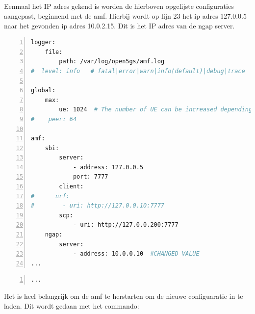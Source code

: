 \subsection{}%
\label{sec:open5gs_amf}%

Eenmaal het IP adres gekend is worden de hierboven opgelijste configuraties aangepast, beginnend met de \gls{amf}. Hierbij wordt op lijn 23 het ip adres 127.0.0.5 naar het gevonden ip adres 10.0.2.15. Dit is het IP  adres van de ngap server.

\begin{lstlisting}[basicstyle=\small, frame=single, breaklines=true, postbreak=\mbox{\textcolor{red}{$\hookrightarrow$}\space}, escapeinside ={\%,}, escapechar={!}, numbers=left, language=sh, caption=Open5GS amf configuratie]
logger:
    file:
        path: /var/log/open5gs/amf.log
#  level: info   # fatal|error|warn|info(default)|debug|trace

global:
    max:
        ue: 1024  # The number of UE can be increased depending on memory size.
#    peer: 64

amf:
    sbi:
        server:
            - address: 127.0.0.5
            port: 7777
        client:
#      nrf:
#        - uri: http://127.0.0.10:7777
        scp:
            - uri: http://127.0.0.200:7777
    ngap:
        server:
            - address: 10.0.0.10  #CHANGED VALUE
...
\end{lstlisting}

\begin{lstlisting}[basicstyle=\small, frame=single, breaklines=true, postbreak=\mbox{\textcolor{red}{$\hookrightarrow$}\space}, escapeinside ={\%,}, escapechar={!}, numbers=left, language=sh, caption=Open5GS upf configuratie]
%TODO:
...
\end{lstlisting}

Het is heel belangrijk om de \gls{amf} te herstarten om de nieuwe configuaratie in te laden. Dit wordt gedaan met het commando: 

\subsection{}%
\label{sec:gnb_config}%

